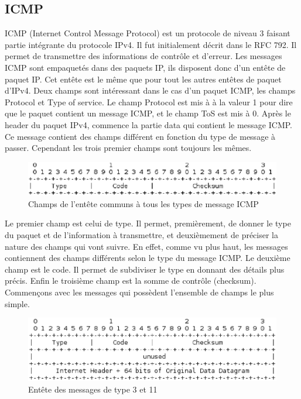 
\subsection{ICMP} ICMP (Internet Control Message Protocol) est un protocole de
niveau 3 faisant partie intégrante du protocole IPv4. Il fut initialement
décrit dans le RFC 792\cite{url-RFC-ICMP}.
Il permet de transmettre des informations de contrôle et d'erreur. Les messages
ICMP sont empaquetés dans des paquets IP, ils disposent donc d'un entête de
paquet IP. Cet entête est le même que pour tout les autres entêtes de paquet
d'IPv4. Deux champs sont intéressant dans le cas d'un paquet ICMP, les champs
Protocol et Type of service. Le champ Protocol est mis à à la valeur 1 pour
dire que le paquet contient un message ICMP, et le champ ToS est mis à 0.
Après le header du paquet IPv4, commence la partie data
qui contient le message ICMP. Ce message contient des champs différent en
fonction du type de message à passer. Cependant les trois premier champs sont
toujours les mêmes.


\begin{figure}[h]
\centering
\includegraphics[width=12cm]{./pics/header.eps}
\caption{Champs de l'entête communs à tous les types de message ICMP}
\label{fig:headicmp}
\end{figure}

Le premier champ est celui de type. Il permet, premièrement, de donner le type
du paquet et de l'information à transmettre, et deuxièmement de préciser la
nature des champs qui vont suivre. En effet, comme vu plus haut, les messages
contiennent des champs différents selon le type du message ICMP.  Le deuxième
champ est le code. Il permet de subdiviser le type en donnant des détails plus
précis. Enfin le troisième champ est la somme de contrôle (checksum).
Commençons avec les messages qui possèdent l'ensemble de champs le plus simple.

\begin{figure}[h]
\centering
\includegraphics[width=12cm]{./pics/header1.eps}
\caption{Entête des messages de type 3 et 11}
\label{fig:head1icmp}
\end{figure}

